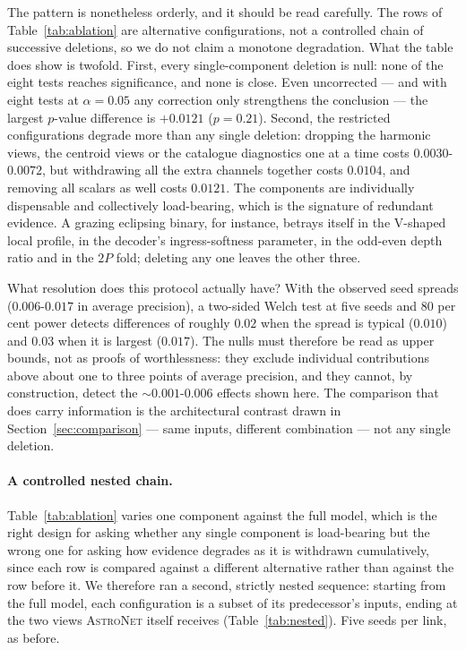 \documentclass[preprint,12pt,authoryear]{elsarticle}
\newcommand{\astronet}{\textsc{AstroNet}}
\begin{document}
The pattern is nonetheless orderly, and it should be read carefully. The rows
of Table~\ref{tab:ablation} are alternative configurations, not a controlled
chain of successive deletions, so we do not claim a monotone degradation. What
the table does show is twofold. First, every single-component deletion is null:
none of the eight tests reaches significance, and none is close. Even
uncorrected --- and with eight tests at $\alpha = 0.05$ any correction only
strengthens the conclusion --- the largest $p$-value difference is $+0.0121$
($p = 0.21$). Second, the restricted configurations degrade more than any single
deletion: dropping the harmonic views, the centroid views or the catalogue
diagnostics one at a time costs $0.0030$-$0.0072$, but withdrawing all the extra
channels together costs $0.0104$, and removing all scalars as well costs $0.0121$.
The components are individually dispensable and collectively load-bearing, which
is the signature of redundant evidence. A grazing eclipsing binary, for instance,
betrays itself in the V-shaped local profile, in the decoder's ingress-softness
parameter, in the odd-even depth ratio and in the $2P$ fold; deleting any one
leaves the other three.

What resolution does this protocol actually have? With the observed seed spreads
($0.006$-$0.017$ in average precision), a two-sided Welch test at five seeds and
$80$ per cent power detects differences of roughly $0.02$ when the spread is
typical ($0.010$) and $0.03$ when it is largest ($0.017$). The nulls must
therefore be read as upper bounds, not as proofs of worthlessness: they exclude
individual contributions above about one to three points of average precision,
and they cannot, by construction, detect the $\sim$$0.001$-$0.006$ effects shown
here. The comparison that does carry information is the architectural contrast
drawn in Section~\ref{sec:comparison} --- same inputs, different combination ---
not any single deletion.

\paragraph{A controlled nested chain.} Table~\ref{tab:ablation} varies one
component against the full model, which is the right design for asking whether
any single component is load-bearing but the wrong one for asking how evidence
degrades as it is withdrawn cumulatively, since each row is compared against a
different alternative rather than against the row before it. We therefore ran a
second, strictly nested sequence: starting from the full model, each
configuration is a subset of its predecessor's inputs, ending at the two views
\astronet{} itself receives (Table~\ref{tab:nested}). Five seeds per link, as
before.
\end{document}
